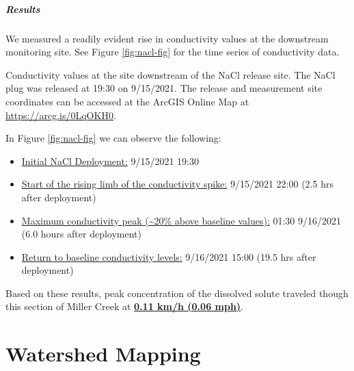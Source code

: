 \documentclass[
]{book}
\begin{document}
\hypertarget{results}{%
\paragraph{Results}\label{results}}

We measured a readily evident rise in conductivity values at the downstream monitoring site. See Figure \ref{fig:nacl-fig} for the time series of conductivity data.

\label{fig:nacl-fig}Conductivity values at the site downstream of the NaCl release site. The NaCl plug was released at 19:30 on 9/15/2021. The release and measurement site coordinates can be accessed at the ArcGIS Online Map at \url{https://arcg.is/0LqOKH0}.

In Figure \ref{fig:nacl-fig} we can observe the following:

\begin{itemize}
\item
  \underline{Initial NaCl Deployment:} 9/15/2021 19:30
\item
  \underline{Start of the rising limb of the conductivity spike:} 9/15/2021 22:00 (2.5 hrs after deployment)
\item
  \underline{Maximum conductivity peak (\textasciitilde20\% above baseline values):} 01:30 9/16/2021 (6.0 hours after deployment)
\item
  \underline{Return to baseline conductivity levels:} 9/16/2021 15:00 (19.5 hrs after deployment)
\end{itemize}

Based on these results, peak concentration of the dissolved solute traveled though this section of Miller Creek at \underline{\textbf{0.11 km/h (0.06 mph)}}.

\hypertarget{watershed-mapping}{%
\chapter{Watershed Mapping}\label{watershed-mapping}}
\end{document}
